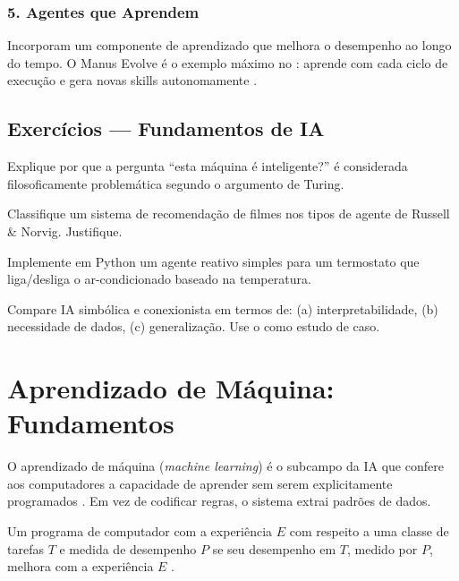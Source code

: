 \subsubsection*{5. Agentes que Aprendem}
Incorporam um componente de aprendizado que melhora o desempenho ao longo
do tempo. O Manus Evolve é o exemplo máximo no \opencodeeco{}:
aprende com cada ciclo de execução e gera novas skills
autonomamente \cite{opencode2026manus}.
\subsection{Exercícios — Fundamentos de IA}
\begin{exercicio}[Nivel 0]
Explique por que a pergunta ``esta máquina é inteligente?'' é considerada
filosoficamente problemática segundo o argumento de Turing.
\end{exercicio}
\begin{exercicio}
Classifique um sistema de recomendação de filmes nos tipos de agente de
Russell \& Norvig. Justifique.
\end{exercicio}
\begin{exercicio}
Implemente em Python um agente reativo simples para um termostato que
liga/desliga o ar-condicionado baseado na temperatura.
\end{exercicio}
\begin{exercicio}
Compare IA simbólica e conexionista em termos de: (a) interpretabilidade,
(b) necessidade de dados, (c) generalização. Use o \opencodeeco{} como
estudo de caso.
\end{exercicio}
\section{Aprendizado de Máquina: Fundamentos}
\label{sec:aprendizado-maquina}
\nivelbasico
O aprendizado de máquina (\textit{machine learning}) é o subcampo da IA que
confere aos computadores a capacidade de aprender sem serem explicitamente
programados \cite{bishop2006pattern, hastie2009elements}. Em vez de codificar
regras, o sistema extrai padrões de dados.
\begin{definicao}
Um programa de computador  com a experiência $E$ com
respeito a uma classe de tarefas $T$ e medida de desempenho $P$ se seu
desempenho em $T$, medido por $P$, melhora com a experiência $E$
\cite{mitchell1997machine, hastie2009elements}.
\end{definicao}
